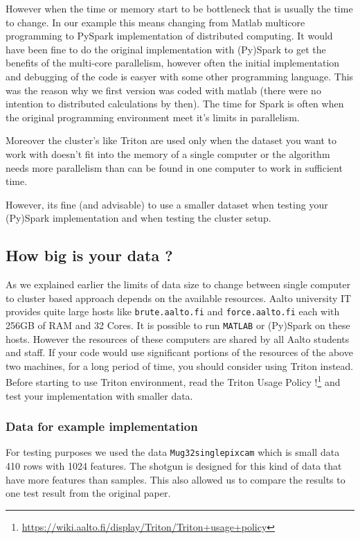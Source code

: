 \documentclass[a4paper,11pt]{article}
\begin{document}
However when the time or memory start to be bottleneck that is usually 
the time to change. In our example this means changing from Matlab multicore programming to PySpark implementation of distributed computing. It would have been fine to do the original implementation with (Py)Spark to get the benefits of the multi-core parallelism, however often the initial implementation and debugging of the code is easyer with some other programming language. This was the reason why we first version was coded with matlab (there were no intention to distributed calculations by then). The time for Spark is often when the original programming environment meet it's limits in parallelism. 

Moreover the cluster's like Triton are used only when the dataset you want to work with doesn't fit into the memory of a single computer or the algorithm needs more parallelism than can be found in one computer to work in sufficient time.

However, its fine (and advisable) to use a smaller dataset when testing 
your (Py)Spark implementation and when testing the cluster setup.

\subsection{How big is your data ?}
As we explained earlier the limits of data size to change between single computer to cluster based approach depends on the available resources. Aalto university IT provides quite large hosts like \texttt{brute.aalto.fi} 
and \texttt{force.aalto.fi} each with 256GB of RAM and 32 Cores. It is 
possible to run \texttt{MATLAB} or (Py)Spark on these hosts. However the 
resources of these computers are shared by all Aalto students and staff. 
If your code would use significant portions of the resources of the above 
two machines, for a long period of time, you should consider using Triton 
instead.
Before starting to use Triton environment, read the Triton Usage Policy !\footnote{\label{note1}\url{https://wiki.aalto.fi/display/Triton/Triton+usage+policy}} and test your implementation with smaller data.

\subsubsection{Data for example implementation}

For testing purposes we used the data \texttt{Mug32singlepixcam} which is small data 410 rows with 1024 features. The shotgun is designed for this kind of data that have more features than samples. This also allowed us to compare the results to one test result from the original paper. 
\end{document}
